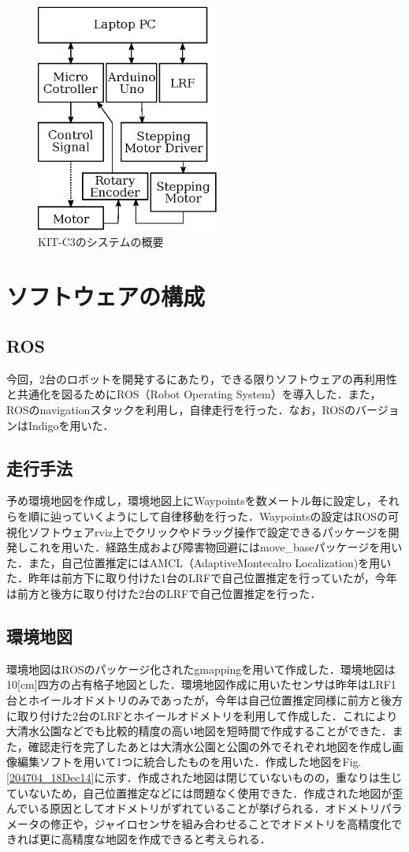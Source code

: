 \documentclass[10pt,a4paper]{jarticle}
\begin{document}
\begin{figure}
  \centering
  \includegraphics[width=6cm]{fig/eps/kitc3_overview.eps}
  \caption{KIT-C3のシステムの概要}
  \label{225251_18Dec14}
\end{figure}

\section{ソフトウェアの構成}
\subsection{ROS}
今回，2台のロボットを開発するにあたり，できる限りソフトウェアの再利用性と共通化を図るためにROS（Robot Operating System）を導入した．また，ROSのnavigationスタックを利用し，自律走行を行った．なお，ROSのバージョンはIndigoを用いた．

\subsection{走行手法}
予め環境地図を作成し，環境地図上にWaypointsを数メートル毎に設定し，それらを順に辿っていくようにして自律移動を行った．Waypointsの設定はROSの可視化ソフトウェアrviz上でクリックやドラッグ操作で設定できるパッケージを開発しこれを用いた．経路生成および障害物回避にはmove\_baseパッケージを用いた．また，自己位置推定にはAMCL（AdaptiveMontecalro Localization)を用いた．昨年は前方下に取り付けた1台のLRFで自己位置推定を行っていたが，今年は前方と後方に取り付けた2台のLRFで自己位置推定を行った．

\subsection{環境地図}
環境地図はROSのパッケージ化されたgmappingを用いて作成した．環境地図は10[cm]四方の占有格子地図とした．環境地図作成に用いたセンサは昨年はLRF1台とホイールオドメトリのみであったが，今年は自己位置推定同様に前方と後方に取り付けた2台のLRFとホイールオドメトリを利用して作成した．これにより大清水公園などでも比較的精度の高い地図を短時間で作成することができた．また，確認走行を完了したあとは大清水公園と公園の外でそれぞれ地図を作成し画像編集ソフトを用いて1つに統合したものを用いた．作成した地図をFig.\ref{204704_18Dec14}に示す．作成された地図は閉じていないものの，重なりは生じていないため，自己位置推定などには問題なく使用できた．作成された地図が歪んでいる原因としてオドメトリがずれていることが挙げられる．オドメトリパラメータの修正や，ジャイロセンサを組み合わせることでオドメトリを高精度化できれば更に高精度な地図を作成できると考えられる．
\end{document}
